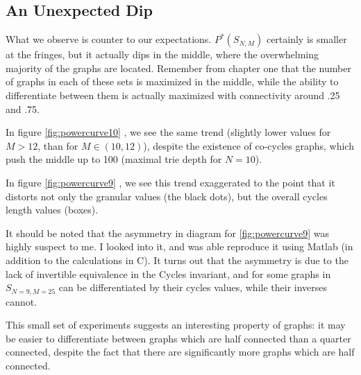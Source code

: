 \subsection{An Unexpected Dip}

What we observe is counter to our expectations.
$P^*(S_{N, M})$ certainly is smaller at the fringes, but it actually dips in the middle, where the overwhelming majority of the graphs are located.
Remember from chapter one that the number of graphs in each of these sets is maximized in the middle, while the ability to differentiate between them is actually maximized with connectivity around .25 and .75.

In figure \ref{fig:powercurve10} , we see the same trend (slightly lower values for $M > 12$, than for $M \in (10, 12)$), despite the existence of co-cycles graphs, which push the middle up to 100 (maximal trie depth for $N=10$).

In figure \ref{fig:powercurve9} , we see this trend exaggerated to the point that it distorts not only the granular values (the black dots), but the overall cycles length values (boxes).

It should be noted that the asymmetry in diagram for \ref{fig:powercurve9} was highly suspect to me.
I looked into it, and was able reproduce it using Matlab (in addition to the calculations in C).  
It turns out that the asymmetry is due to the lack of invertible equivalence in the Cycles invariant, and for some graphs in $S_{N=9, M=25}$ can be differentiated by their cycles values, while their inverses cannot.

This small set of experiments suggests an interesting property of graphs: it may be easier to differentiate between graphs which are half connected than a quarter connected, despite the fact that there are significantly more graphs which are half connected.
